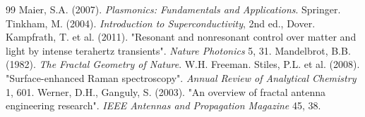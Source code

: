 \documentclass[12pt]{article}
\theoremstyle{remark}
\begin{document}
\begin{thebibliography}{99}
		 Maier, S.A. (2007). \textit{Plasmonics: Fundamentals and Applications}. Springer.
		 Tinkham, M. (2004). \textit{Introduction to Superconductivity}, 2nd ed., Dover.
		 Kampfrath, T. et al. (2011). "Resonant and nonresonant control over matter and light by intense terahertz transients". \textit{Nature Photonics} 5, 31.
		 Mandelbrot, B.B. (1982). \textit{The Fractal Geometry of Nature}. W.H. Freeman.
		 Stiles, P.L. et al. (2008). "Surface-enhanced Raman spectroscopy". \textit{Annual Review of Analytical Chemistry} 1, 601.
		 Werner, D.H., Ganguly, S. (2003). "An overview of fractal antenna engineering research". \textit{IEEE Antennas and Propagation Magazine} 45, 38.
	\end{thebibliography}
	
\end{document}

